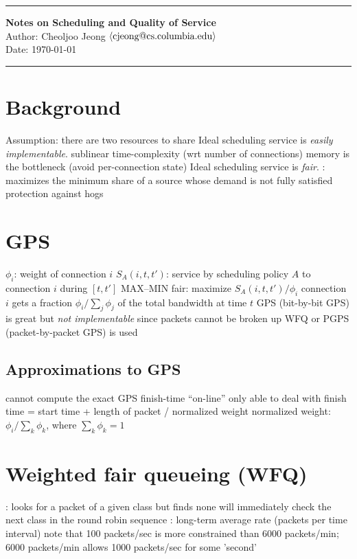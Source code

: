 \documentclass{myart}
\begin{document}
\small
\hrule
\vspace*{0.2cm}
\noindent
{\normalsize\bf Notes on Scheduling and Quality of Service}
\vspace*{0.1cm}\\
{\small{}Author: Cheoljoo Jeong $\mbox{$\langle{\textit{\mbox{\em{}cjeong@cs.columbia.edu\/}}}\rangle$}$}\\
{\small{}Date: \today} \vspace*{0.1cm}
\hrule



\section{Background}
\bit
\w Assumption: there are two resources to share
	\bit
	\w {}
	\w {}
	\eit
\w Ideal scheduling service is {\em easily implementable}.
	\bit
	\w sublinear time-complexity (wrt number of connections)
	\w memory is the bottleneck (avoid per-connection state)
	\eit
\w Ideal scheduling service is {\em fair\/}.
	\bit
	\w {}: maximizes the minimum share of a source
		whose demand is not fully satisfied
	\w protection against hogs
	\eit
\eit

\section{GPS}
\bit
\w $\phi_i$: weight of connection $i$
\w $S_A(i, t, t')$: service by scheduling policy $A$
	to connection $i$ during $[t, t']$
\w MAX--MIN fair: maximize $S_A(i, t, t')/\phi_i$
	\bit
	\w connection $i$ gets a fraction
	$\phi_i/\sum_j \phi_j$ of the total bandwidth
	at time $t$
	\eit
\w GPS (bit-by-bit GPS) is great but {\em not implementable\/} since
	packets cannot be broken up
	\bit
	\w WFQ or PGPS (packet-by-packet GPS) is used
	\eit
\eit
\subsection{Approximations to GPS}
\bit
\w cannot compute the exact GPS finish-time ``on-line''
\w only able to deal with 
\w finish time = start time + length of packet / normalized weight
	\bit
	\w normalized weight: $\phi_i/\sum_k \phi_k$, where
		$\sum_k \phi_k = 1$
	\eit
\eit
	


\section{Weighted fair queueing (WFQ)}
\bit
\w {}: looks for a packet of
	a given class but finds none will immediately check the next class
	in the round robin sequence
\w {}: long-term average rate (packets per time interval)
	\bit
	\w note that 100 packets/sec is more constrained than 6000
	packets/min;
		6000 packets/min allows 1000 packets/sec for some 'second'
\end{document}
